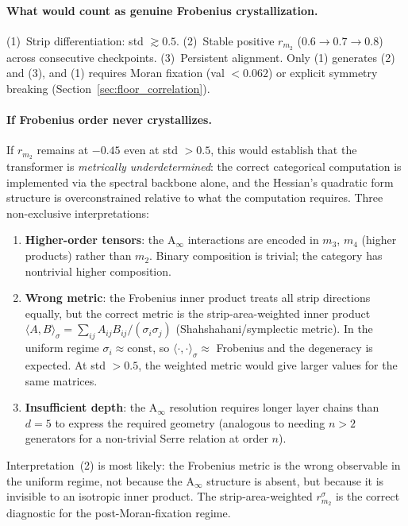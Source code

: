 \documentclass[11pt]{amsart}
\begin{document}
\paragraph{What would count as genuine Frobenius crystallization.}
(1)~Strip differentiation: std $\gtrsim 0.5$.
(2)~Stable positive $r_{m_2}$ ($0.6\to 0.7\to 0.8$) across consecutive
checkpoints.
(3)~Persistent alignment.
Only (1) generates (2) and (3), and (1) requires Moran fixation
(val $< 0.062$) or explicit symmetry breaking
(Section~\ref{sec:floor_correlation}).

\paragraph{If Frobenius order never crystallizes.}
If $r_{m_2}$ remains at $-0.45$ even at std $> 0.5$, this would
establish that the transformer is \emph{metrically underdetermined}:
the correct categorical computation is implemented via the spectral
backbone alone, and the Hessian's quadratic form structure is
overconstrained relative to what the computation requires.
Three non-exclusive interpretations:
\begin{enumerate}
\item \textbf{Higher-order tensors}: the A$_\infty$ interactions
  are encoded in $m_3$, $m_4$ (higher products) rather than $m_2$.
  Binary composition is trivial; the category has nontrivial
  higher composition.
\item \textbf{Wrong metric}: the Frobenius inner product treats
  all strip directions equally, but the correct metric is the
  strip-area-weighted inner product
  $\langle A, B\rangle_\sigma = \sum_{ij} A_{ij}B_{ij}/(\sigma_i\sigma_j)$
  (Shahshahani/symplectic metric).
  In the uniform regime $\sigma_i \approx \mathrm{const}$,
  so $\langle\cdot,\cdot\rangle_\sigma \approx$ Frobenius and
  the degeneracy is expected.
  At std $> 0.5$, the weighted metric would give larger values
  for the same matrices.
\item \textbf{Insufficient depth}: the A$_\infty$ resolution
  requires longer layer chains than $d=5$ to express the required
  geometry (analogous to needing $n > 2$ generators for a
  non-trivial Serre relation at order $n$).
\end{enumerate}
Interpretation~(2) is most likely: the Frobenius metric is the
wrong observable in the uniform regime, not because the
A$_\infty$ structure is absent, but because it is invisible to
an isotropic inner product.
The strip-area-weighted $r_{m_2}^\sigma$ is the correct
diagnostic for the post-Moran-fixation regime.
\end{document}
